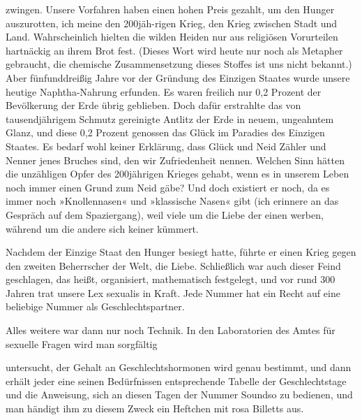 zwingen. Unsere Vorfahren haben einen hohen Preis gezahlt, um den
Hunger auszurotten, ich meine den 200jäh-rigen Krieg, den Krieg
zwischen Stadt und Land. Wahrscheinlich hielten die wilden Heiden
nur aus religiösen Vorurteilen hartnäckig an ihrem Brot fest.
(Dieses Wort wird heute nur noch als Metapher gebraucht, die
chemische Zusammensetzung dieses Stoffes ist uns nicht bekannt.)
Aber fünfunddreißig Jahre vor der Gründung des Einzigen Staates
wurde unsere heutige Naphtha-Nahrung erfunden. Es waren freilich
nur 0,2 Prozent der Bevölkerung der Erde übrig geblieben. Doch
dafür erstrahlte das von tausendjährigem Schmutz gereinigte Antlitz
der Erde in neuem, ungeahntem Glanz, und diese 0,2 Prozent genossen
das Glück im Paradies des Einzigen Staates. Es bedarf wohl keiner
Erklärung, dass Glück und Neid Zähler und Nenner jenes Bruches
sind, den wir Zufriedenheit nennen. Welchen Sinn hätten die
unzähligen Opfer des 200jährigen Krieges gehabt, wenn es in unserem
Leben noch immer einen Grund zum Neid gäbe? Und doch existiert er
noch, da es immer noch »Knollennasen« und »klassische Nasen« gibt
(ich erinnere an das Gespräch auf dem Spaziergang), weil viele um
die Liebe der einen werben, während um die andere sich keiner
kümmert.

Nachdem der Einzige Staat den Hunger besiegt hatte, führte er einen
Krieg gegen den zweiten Beherrscher der Welt, die Liebe.
Schließlich war auch dieser Feind geschlagen, das heißt,
organisiert, mathematisch festgelegt, und vor rund 300 Jahren trat
unsere Lex sexualis in Kraft. Jede Nummer hat ein Recht auf eine
beliebige Nummer als Geschlechtspartner.

Alles weitere war dann nur noch Technik. In den Laboratorien des
Amtes für sexuelle Fragen wird man sorgfältig

untersucht, der Gehalt an Geschlechtshormonen wird genau bestimmt,
und dann erhält jeder eine seinen Bedürfnissen entsprechende
Tabelle der Geschlechtstage und die Anweisung, sich an diesen Tagen
der Nummer Soundso zu bedienen, und man händigt ihm zu diesem Zweck
ein Heftchen mit rosa Billetts aus.

